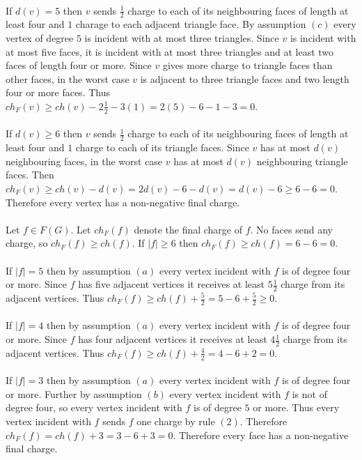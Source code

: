 \documentclass[letterpaper,12pt,oneside,onecolumn]{report}
\begin{document}
\paragraph{}
If $d(v) = 5$ then $v$ sends $\frac{1}{2}$ charge to each of its neighbouring faces of length at least four and $1$ charage to each adjacent triangle face. By assumption $(c)$ every vertex of degree $5$ is incident with at most three triangles. Since $v$ is incident with at most five faces, it is incident with at most three triangles and at least two faces of length four or more. Since $v$ gives more charge to triangle faces than other faces, in the worst case $v$ is adjacent to three triangle faces and two length four or more faces. Thus $ch_F(v) \geq ch(v) - 2\frac{1}{2} - 3(1) = 2(5) - 6 -1 - 3 = 0$.
\paragraph{}
If $d(v) \geq 6$ then $v$ sends $\frac{1}{2}$ charge to each of its neighbouring faces of length at least four and $1$ charge to each of its triangle faces. Since $v$ has at most $d(v)$ neighbouring faces, in the worst case $v$ has at most $d(v)$ neighbouring triangle faces. Then $ch_F(v) \geq ch(v) - d(v) = 2d(v) - 6 - d(v) = d(v) - 6 \geq 6 - 6 = 0$. Therefore every vertex has a non-negative final charge.
\paragraph{}
Let $f \in F(G)$. Let $ch_F(f)$ denote the final charge of $f$. No faces send any charge, so $ch_F(f) \geq ch(f)$. If $|f| \geq 6$ then $ch_F(f) \geq ch(f) = 6 -6 =0$.
\paragraph{}
If $|f| = 5$ then by assumption $(a)$ every vertex incident with $f$ is of degree four or more. Since $f$ has five adjacent vertices it receives at least $5\frac{1}{2}$ charge from its adjacent vertices. Thus $ch_F(f) \geq ch(f) + \frac{5}{2} = 5 - 6 + \frac{5}{2} \geq 0$.
\paragraph{}
If $|f| = 4$ then by assumption $(a)$ every vertex incident with $f$ is of degree four or more. Since $f$ has four adjacent vertices it receives at least $4\frac{1}{2}$ charge from its adjacent vertices. Thus $ch_F(f) \geq ch(f) + \frac{4}{2} = 4 - 6 + 2 = 0$.  
\paragraph{}
If $|f| = 3$ then by assumption $(a)$ every vertex incident with $f$ is of degree four or more. Further by assumption $(b)$ every vertex incident with $f$ is not of degree four, so every vertex incident with $f$ is of degree $5$ or more. Thus every vertex incident with $f$ sends $f$ one charge by rule $(2)$. Therefore $ch_F(f) = ch(f) + 3 = 3 - 6 + 3 = 0$. Therefore every face has a non-negative final charge.
\end{document}
